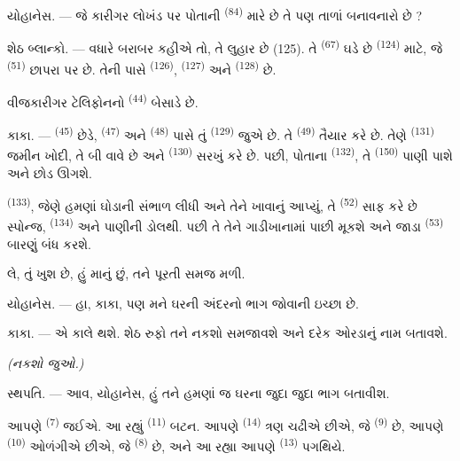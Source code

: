 \textsc{યોહાનેસ}. --- જે કારીગર લોખંડ પર પોતાની 
\textsuperscript{(84)} મારે છે તે પણ તાળાં બનાવનારો છે ?

\textsc{શેઠ બ્લાન્કો}. --- વધારે બરાબર કહીએ તો, તે લુહાર છે (125). તે
 \textsuperscript{(67)} ઘડે છે
 \textsuperscript{(124)} માટે, જે 
\textsuperscript{(51)} છાપરા પર છે. તેની પાસે 
\textsuperscript{(126)},  \textsuperscript{(127)} અને
 \textsuperscript{(128)} છે.

વીજકારીગર ટેલિફોનનો  \textsuperscript{(44)}
 બેસાડે છે.

\VUsaut{3.0mm}

\textsc{કાકા}. ---  \textsuperscript{(45)} છેડે,
 \textsuperscript{(47)} અને 
\textsuperscript{(48)} પાસે તું  \textsuperscript{(129)}
જુએ છે. તે  \textsuperscript{(49)} તૈયાર કરે છે.
તેણે  \textsuperscript{(131)} જમીન ખોદી, તે બી વાવે
છે અને  \textsuperscript{(130)} સરખું કરે છે. પછી,
પોતાના  \textsuperscript{(132)}, તે 
\textsuperscript{(150)} પાણી પાશે અને છોડ ઊગશે.

 \textsuperscript{(133)}, જેણે હમણાં ઘોડાની
સંભાળ લીધી અને તેને ખાવાનું આપ્યું, તે 
\textsuperscript{(52)} સાફ કરે છે સ્પોન્જ, 
\textsuperscript{(134)} અને પાણીની ડોલથી. પછી તે તેને ગાડીખાનામાં પાછી
મૂકશે અને જાડા  \textsuperscript{(53)} બારણું બંધ
કરશે.

લે, તું ખુશ છે, હું માનું છું, તને પૂરતી સમજ મળી.

\textsc{યોહાનેસ}. --- હા, કાકા, પણ મને ઘરની અંદરનો ભાગ જોવાની ઇચ્છા
છે.

\textsc{કાકા}. --- એ કાલે થશે. શેઠ રુફો તને નકશો સમજાવશે અને દરેક
ઓરડાનું નામ બતાવશે.

\VUsaut{3.0mm}
\VUsaut{2.4mm}

{\centering\textit{(નકશો જુઓ.)}\par}
\VUsaut{2.4mm}

\textsc{સ્થપતિ}. --- આવ, યોહાનેસ, હું તને હમણાં જ ઘરના જુદા જુદા ભાગ
બતાવીશ.

આપણે  \textsuperscript{(7)} જઈએ. આ રહ્યું
 \textsuperscript{(11)} બટન. આપણે 
\textsuperscript{(14)} ત્રણ  ચઢીએ છીએ, જે
 \textsuperscript{(9)} છે, આપણે 
\textsuperscript{(10)} ઓળંગીએ છીએ, જે 
\textsuperscript{(8)} છે, અને આ રહ્યા આપણે 
\textsuperscript{(13)} પગથિયે.

